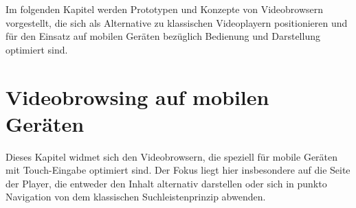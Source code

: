 \documentclass[11pt,a4paper]{report}
\begin{document}
Im folgenden Kapitel werden Prototypen und Konzepte von Videobrowsern vorgestellt, die sich als Alternative zu klassischen Videoplayern positionieren und für den Einsatz auf mobilen Geräten bezüglich Bedienung und Darstellung optimiert sind.

\section{Videobrowsing auf mobilen Geräten}

Dieses Kapitel widmet sich den Videobrowsern, die speziell für mobile Geräten mit Touch-Eingabe optimiert sind. Der Fokus liegt hier insbesondere auf die Seite der Player, die entweder den Inhalt alternativ darstellen oder sich in punkto Navigation von dem klassischen Suchleistenprinzip abwenden.
\end{document}
